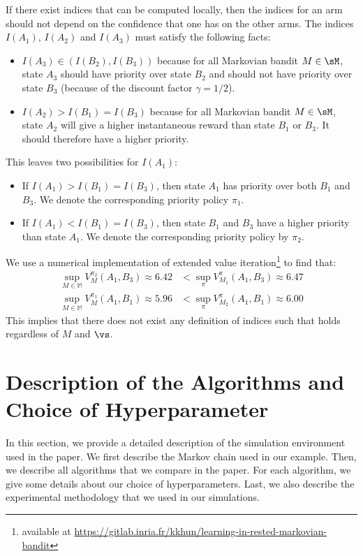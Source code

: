 \begin{subappendices}
If there exist indices that can be computed locally, then the indices for an arm should not depend on the confidence that one has on the other arms. The indices $I(A_1)$, $I(A_2)$ and $I(A_3)$ must satisfy the following facts: 
\begin{itemize}
    \item $I(A_3)\in(I(B_2),I(B_3))$ because for all Markovian bandit $M\in\sM$, state $A_3$ should have priority over state $B_2$ and should not have priority over state $B_3$ (because of the discount factor $\gamma=1/2$).
    \item $I(A_2)>I(B_1)=I(B_3)$ because for all Markovian bandit $M\in\sM$, state $A_2$ will give a higher instantaneous reward than state $B_1$ or $B_3$. It should therefore have a higher priority.
\end{itemize}
This leaves two possibilities for $I(A_1)$: 
\begin{itemize}
\item If $I(A_1)>I(B_1)=I(B_3)$, then state $A_1$ has priority over both $B_1$ and $B_3$.  We denote the corresponding priority policy $\pi_1$.
\item If $I(A_1)<I(B_1)=I(B_3)$, then state $B_1$ and $B_3$ have a higher priority than state $A_1$. We denote the corresponding priority policy by $\pi_2$.
\end{itemize}  

We use a numerical implementation of extended value iteration\footnote{available at \url{https://gitlab.inria.fr/kkhun/learning-in-rested-markovian-bandit}} to find that:
\begin{align*}
    \sup_{M\in\mathbb{M}} V^{\pi_2}_{M}(A_1,B_3) \approx 6.42
    &< \sup_{\pi}V^{\pi}_{M_1}(A_1,B_3) \approx 6.47 \\
    \sup_{M\in\mathbb{M}} V^{\pi_1}_{M}(A_1,B_1) \approx 5.96
    &< \sup_{\pi}V^{\pi}_{M_2}(A_1,B_1) \approx 6.00 \nonumber
\end{align*}
This implies that there does not exist any definition of indices such that  holds regardless of $M$ and $\vs$. 

\section{Description of the Algorithms and Choice of Hyperparameter}
\label{apx:algos}

In this section, we provide a detailed description of the simulation environment used in the paper. We first describe the Markov chain used in our example. Then, we describe all algorithms that we compare in the paper. For each algorithm, we give some details about our choice of hyperparameters. Last, we also describe the experimental methodology that we used in our simulations. 


\end{subappendices}
